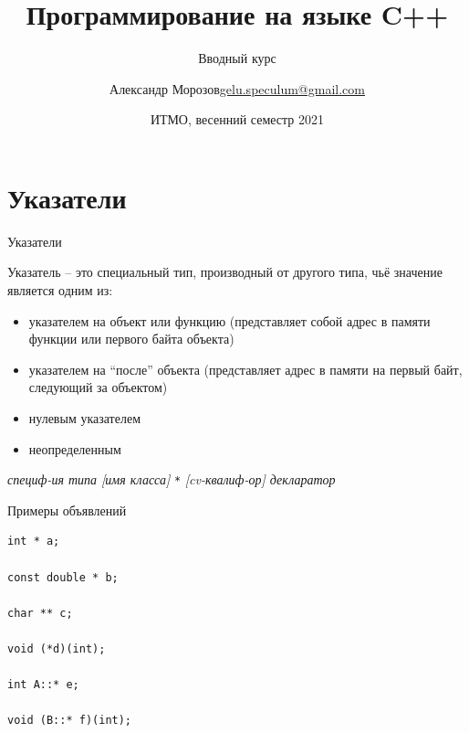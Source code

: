 \documentclass[unknownkeysallowed,xcolor=table]{beamer}
\title[C++]
{Программирование на языке C++}
\subtitle{Вводный курс}
\author[А.~Б.~Морозов]
{
  \texorpdfstring{Александр Морозов\newline\href{mailto:gelu.speculum@gmail.com}{gelu.speculum@gmail.com}}
  {Александр Морозов}
}
\date[ITMO 2021]
{ИТМО, весенний семестр 2021}
\begin{document}
\frame{\titlepage}


\section{Указатели}

\begin{frame}[fragile]{Указатели}

Указатель -- это специальный тип, производный от другого типа, чьё значение является одним из:

\vspace{0.7em}

\begin{itemize}
  \item указателем на объект или функцию (представляет собой адрес в памяти функции или первого байта объекта) \vspace{0.5em}
  \item указателем на ``после'' объекта (представляет адрес в памяти на первый байт, следующий за объектом) \vspace{0.5em}
  \item нулевым указателем \vspace{0.5em}
  \item неопределенным
\end{itemize}

\vspace{1.5em}

\emph{специф-ия типа [имя класса]} \lstinline{*} \emph{[cv-квалиф-ор] декларатор} 

\end{frame}

\begin{frame}[fragile]{Примеры объявлений}

\begin{lstlisting}
int * a;

const double * b;

char ** c;

void (*d)(int);

int A::* e;

void (B::* f)(int);
\end{lstlisting}

\end{frame}
\end{document}
